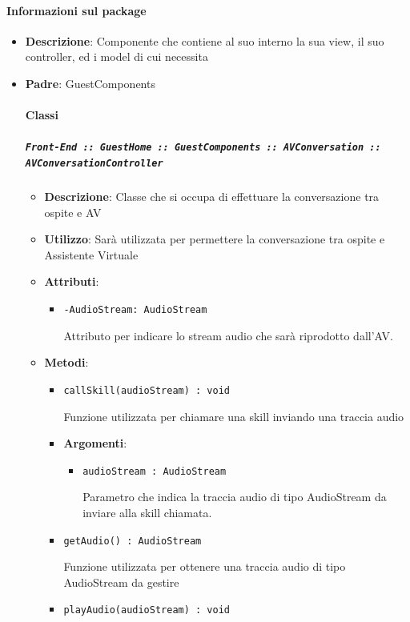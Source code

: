 \documentclass[../DefinizioneDiProdotto.tex]{subfiles}
\begin{document}
	\paragraph{Informazioni sul package}\begin{itemize}\item \textbf{Descrizione}: Componente che contiene al suo interno la sua view, il suo controller, ed i model di cui necessita\item \textbf{Padre}: GuestComponents\paragraph{Classi}
	\subparagraph{\texttt{Front-End :: GuestHome :: GuestComponents :: AVConversation :: AVConversationController}}
	\begin{itemize}\item \textbf{Descrizione}: Classe che si occupa di effettuare la conversazione tra ospite e AV
	\item \textbf{Utilizzo}: Sarà utilizzata per permettere la conversazione tra ospite e Assistente Virtuale
	\item \textbf{Attributi}:
	\begin{itemize}
	\item \texttt{-AudioStream: AudioStream}\

	 Attributo per indicare lo stream audio che sarà riprodotto dall'AV.
	\end{itemize}
	\item \textbf{Metodi}:
	\begin{itemize}
	\item \texttt{callSkill(audioStream) : void}\

	 Funzione utilizzata per chiamare una skill inviando una traccia audio

	\item \textbf{Argomenti}:
	\begin{itemize}
	\item \texttt{audioStream : AudioStream}\

	 Parametro che indica la traccia audio di tipo AudioStream da inviare alla skill chiamata.
	\end{itemize}
	\end{itemize}\vspace{0.5em}
	\begin{itemize}
	\item \texttt{getAudio() : AudioStream}\

	 Funzione utilizzata per ottenere una traccia audio di tipo AudioStream da gestire
	\end{itemize}\vspace{0.5em}
	\begin{itemize}
	\item \texttt{playAudio(audioStream) : void}\


\end{itemize}
\end{itemize}
\end{itemize}
\end{document}
